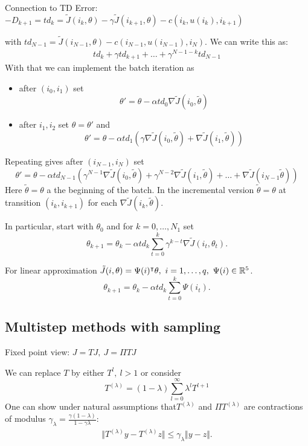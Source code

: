 Connection to TD Error: \(-D_{k+1}=td_k=\tilde{J}(i_k,\theta)-\gamma\tilde{J}(i_{k+1},\theta)-c(i_k,u(i_k),i_{k+1})\)

with \(td_{N-1}=\tilde{J}(i_{N-1},\theta)-c(i_{N-1},u(i_{N-1}),i_N)\).
We can write this as: 
\begin{align*}
    td_k+\gamma td_{k+1}+\dots+\gamma^{N-1-k}td_{N-1}
\end{align*}
With that we can implement the batch iteration as 
\begin{itemize}
    \item after \((i_0,i_{1})\) set \[\theta'=\theta-\alpha td_0\nabla \tilde{J}(i_0,\tilde{\theta})\]
    \item after \(i_{1},i_{2}\) set \(\theta=\theta'\) and \[\theta'=\theta-\alpha td_{1}\left(\gamma\nabla\tilde{J}(i_0,\tilde{\theta})+\nabla\tilde{J}(i_1,\tilde{\theta})\right)\]
\end{itemize}
Repeating gives after \((i_{N-1},i_N)\) set 
\[\theta'=\theta-\alpha td_{N-1}\left(\gamma^{N-1}\nabla\tilde{J}(i_0,\tilde{\theta})+\gamma^{N-2}\nabla\tilde{J}(i_1,\tilde{\theta})+\dots+\nabla\tilde{J}(i_{N-1}\tilde{\theta})\right)\]
Here \(\tilde{\theta}=\theta\) a the beginning of the batch. In the incremental version \(\tilde{\theta}=\theta\) at transition \((i_k,i_{k+1})\) for each \(\nabla\tilde{J}(i_k,\tilde{\theta})\).

In particular, start with \(\theta_0\) and for \(k=0,\dots,N_1\) set 
\[\theta_{k+1}=\theta_k-\alpha td_k\sum_{t=0}^k\gamma^{k-t}\nabla\tilde{J}(i_t,\theta_t).\]

For linear approximation \(\tilde{J}(i,\theta)=\Psi(i)^\intercal\theta,\ i=1,\dots,q,\ \Psi(i)\in \R^5\).
\[\theta_{k+1}=\theta_k-\alpha td_k\sum_{t=0}^k \Psi(i_t).\]
 

\subsection{Multistep methods with sampling}

Fixed point view: \(J=TJ,\ J=\Pi TJ\)

We can replace \(T\) by either \(T^l,\ l>1\) or consider 
\[T^{(\lambda)}=(1-\lambda)\sum_{l=0}^\infty \lambda^l T^{l+1}\]
One can show under natural assumptions that\(T^{(\lambda)}\) and \(\Pi T^{(\lambda)}\) are contractions 
of modulus \(\gamma_\lambda=\frac{\gamma(1-\lambda)}{1-\gamma\lambda}\):
\begin{align*}
    \Vert T^{(\lambda)}y-T^{(\lambda)}z\Vert \leq \gamma_\lambda\Vert y-z \Vert.
\end{align*}

